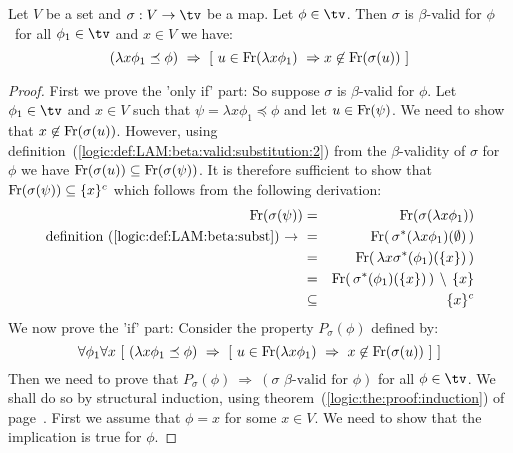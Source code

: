 \begin{prop}\label{logic:prop:LAM:beta:validsub:criterion}
    Let $V$ be a set and $\sigma:V\to\tv$ be a map. Let $\phi\in\tv$.
    Then $\sigma$ is $\beta$-valid for $\phi$ \ifand\ for all $\phi_{1}\in\tv$
    and $x\in V$ we have:
    \[
        (\lambda x\phi_{1}\preceq\phi)\
            \Rightarrow\ 
            [\ 
                u\in\free(\lambda x\phi_{1})\ 
                    \Rightarrow
                x\not\in\free(\sigma(u))
            \ ]
    \]
\end{prop}
\begin{proof}
    First we prove the 'only if' part: So suppose $\sigma$ is $\beta$-valid for
    $\phi$. Let $\phi_{1}\in\tv$ and $x\in V$ such that 
    $\psi=\lambda x\phi_{1}\preceq\phi$ and let $u\in\mbox{\rm Fr}(\psi)$. We need to
    show that $x\not\in\mbox{\rm Fr}(\sigma(u))$. However, using
    definition~(\ref{logic:def:LAM:beta:valid:substitution:2}) from the
    $\beta$-validity of $\sigma$ for $\phi$ we have 
    $\mbox{\rm Fr}(\sigma(u))\subseteq\mbox{\rm Fr}(\sigma(\psi))$. It is therefore sufficient
    to show that $\mbox{\rm Fr}(\sigma(\psi))\subseteq\{x\}^{c}$ which follows from the
    following derivation:
        \begin{eqnarray*}\free(\sigma(\psi))
            &=&\free(\sigma(\lambda x\phi_{1}))\\
            \mbox{definition~(\ref{logic:def:LAM:beta:subst})\ $\rightarrow$\ }
            &=&\free(\,\sigma^{*}(\lambda x\phi_{1})(\emptyset)\,)\\
            &=&\free(\,\lambda x\sigma^{*}(\phi_{1})(\{x\})\,)\\
            &=&\free(\,\sigma^{*}(\phi_{1})(\{x\})\,)\,\setminus\,\{x\}\\
            &\subseteq&\{x\}^{c}
        \end{eqnarray*}
    We now prove the 'if' part: Consider the property $P_{\sigma}(\phi)$
    defined by:
    \[
        \forall\phi_{1}\forall x\ 
            [\ (\lambda x\phi_{1}\preceq\phi)\ 
                    \Rightarrow\ 
                [\
                    u\in\free(\lambda x\phi_{1})\ 
                        \Rightarrow\
                    x\not\in\free(\sigma(u))
                \ ]
            \ ]
    \]
    Then we need to prove that $P_{\sigma}(\phi)\ \Rightarrow\ (\mbox{$\sigma$
    $\beta$-valid for $\phi$})$ for all $\phi\in\tv$. We shall do so by structural 
    induction, using theorem~(\ref{logic:the:proof:induction}) of
    page~\pageref{logic:the:proof:induction}. First we assume that $\phi=x$
    for some $x\in V$. We need to show that the implication is true for $\phi$.

\end{proof}
